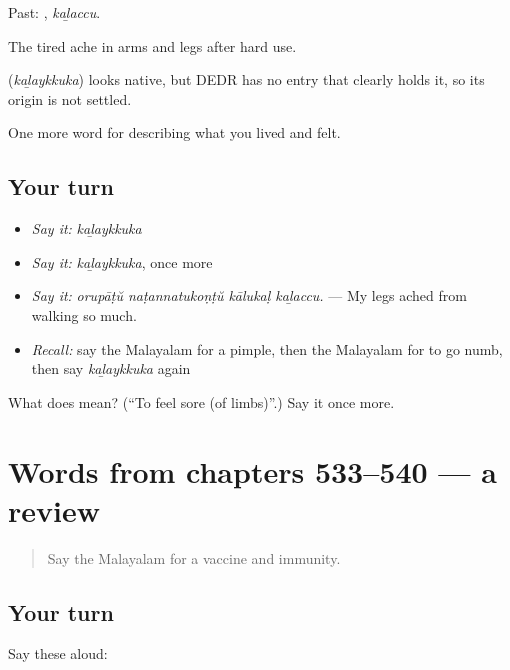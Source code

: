 Past: , \emph{kaḻaccu}.

The tired ache in arms and legs after hard use.

\begin{cousinweb}
\textbf{} (\emph{kaḻaykkuka}) looks native, but DEDR has no entry that clearly holds it, so its origin is not settled.
\end{cousinweb}

\begin{grammarlens}[title={What you've built}]
One more word for describing what you lived and felt.
\end{grammarlens}

\subsection*{Your turn}
\begin{itemize}
\raggedright
  \item \emph{Say it:} \emph{kaḻaykkuka}
  \item \emph{Say it:} \emph{kaḻaykkuka}, once more
  \item \emph{Say it:} \emph{orupāṭŭ naṭannatukoṇṭŭ kālukaḷ kaḻaccu.} — My legs ached from walking so much.
  \item \emph{Recall:} say the Malayalam for a pimple, then the Malayalam for to go numb, then say \emph{kaḻaykkuka} again
\end{itemize}

\begin{tcolorbox}[breakable,colback=teal!4,colframe=teal!35!black,title={Before you move on}]
What does  mean? (\textquotedblleft{}To feel sore (of limbs)\textquotedblright{}.) Say it once more.
\end{tcolorbox}
\section[(dialogue)]{Words from chapters 533–540 — a review}

\label{lesson:ML-R540-review-533-540}



\begin{quote}
Say the Malayalam for a vaccine and immunity.
\end{quote}

\subsection*{Your turn}
Say these aloud:

